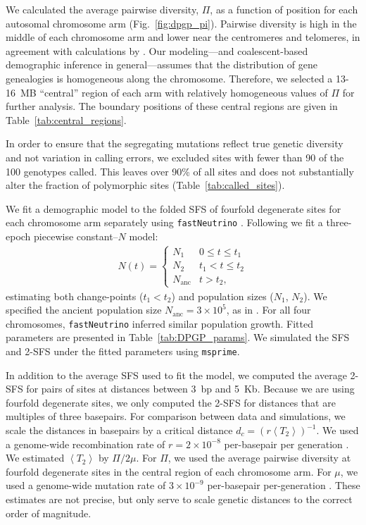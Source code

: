 \documentclass[11pt, letterpaper]{article}   	%
\newcommand{\fig}[1]{Fig.~\ref{#1}}
\newcommand{\E}[1]{\left< #1 \right>}
\begin{document}
We calculated the average pairwise diversity, $\Pi$, as a function of position for each autosomal chromosome arm (\fig{fig:dpgp_pi}).
Pairwise diversity is high in the middle of each chromosome arm and lower near the centromeres and telomeres, in agreement with calculations by \textcite{Corbett-DetigEtAl2015}.
Our modeling---and coalescent-based demographic inference in general---assumes that the distribution of gene genealogies is homogeneous along the chromosome.
Therefore, we selected a 13-16~MB ``central'' region of each arm with relatively homogeneous values of $\Pi$ for further analysis.
The boundary positions of these central regions are given in Table~\ref{tab:central_regions}.

In order to ensure that the segregating mutations reflect true genetic diversity and not variation in calling errors, we excluded sites with fewer than 90 of the 100 genotypes called.
This leaves over 90\% of all sites and does not substantially alter the fraction of polymorphic sites (Table~\ref{tab:called_sites}).

We fit a demographic model to the folded SFS of fourfold degenerate sites for each chromosome arm separately using \texttt{fastNeutrino} \autocite{BhaskarEtAl2015}.
Following \textcite{RagsdaleGutenkunst2017} we fit a three-epoch piecewise constant--$N$ model:
\begin{align}
    N(t) = \begin{cases}
                N_1 & 0 \leq t \leq t_1 \\
                N_2 & t_1 <  t \leq t_2 \\
                N_{\text{anc}} & t > t_2,
            \end{cases}
    \label{eq:piecewise}
\end{align}
estimating both change-points ($t_1 < t_2$) and population sizes ($N_1$, $N_2$).
We specified the ancient population size $N_{\text{anc}} = 3\times 10^5$, as in \textcite{RagsdaleGutenkunst2017}.
For all four chromosomes, \texttt{fastNeutrino} inferred similar population growth.
Fitted parameters are presented in Table~\ref{tab:DPGP_params}.
We simulated the SFS and 2-SFS under the fitted parameters using \texttt{msprime}.

In addition to the average SFS used to fit the model, we computed the average 2-SFS for pairs of sites at distances between 3~bp and 5~Kb.
Because we are using fourfold degenerate sites, we only computed the 2-SFS for distances that are multiples of three basepairs.
For comparison between data and simulations, we scale the distances in basepairs by a critical distance $d_c = (r\E{T_2})^{-1}$.
We used a genome-wide recombination rate of $r = 2 \times 10^{-8}$ per-basepair per generation \autocite{ComeronEtAl2012}.
We estimated $\E{T_2}$ by $\Pi / 2 \mu$.
For $\Pi$, we used the average pairwise diversity at fourfold degenerate sites in the central region of each chromosome arm.
For $\mu$, we used a genome-wide mutation rate of $3 \times 10^{-9}$ per-basepair per-generation \autocite{KeightleyEtAl2014}.
These estimates are not precise, but only serve to scale genetic distances to the correct order of magnitude.
\end{document}
